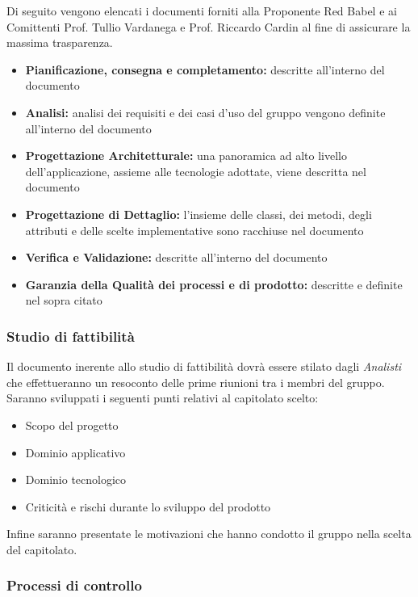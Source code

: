 Di seguito vengono elencati i documenti forniti alla Proponente Red Babel e ai Comittenti Prof. Tullio Vardanega e Prof. Riccardo Cardin al fine di assicurare la massima trasparenza.
\begin{itemize}
\item \textbf{Pianificazione, consegna e completamento:} descritte all’interno del documento \pianodiprogetto
\item \textbf {Analisi:} analisi dei requisiti e dei casi d’uso del gruppo vengono definite all’interno del documento \analisideirequisiti
\item \textbf {Progettazione Architetturale:} una panoramica ad alto livello dell’applicazione, assieme alle tecnologie adottate, viene descritta nel documento 
\item \textbf{Progettazione di Dettaglio:} l’insieme delle classi, dei metodi, degli attributi e delle scelte implementative sono racchiuse nel documento 
\item \textbf{Verifica e Validazione:} descritte all’interno del documento \pianodiqualifica
\item \textbf{Garanzia della Qualità dei processi e di prodotto:} descritte e definite nel
sopra citato \pianodiqualifica
\end{itemize}


\subsubsection{Studio di fattibilità}

Il documento inerente allo studio di fattibilità dovrà essere stilato
dagli  \emph{Analisti}  che effettueranno un resoconto delle prime riunioni tra
i membri del gruppo. Saranno sviluppati i seguenti punti relativi al
capitolato scelto: 
\begin{itemize}
\item Scopo del progetto
\item Dominio applicativo
\item Dominio tecnologico
\item Criticità e rischi durante lo sviluppo del prodotto
\end{itemize}
Infine saranno presentate le motivazioni che hanno condotto il gruppo
nella scelta del capitolato.



\subsubsection{Processi di controllo}

